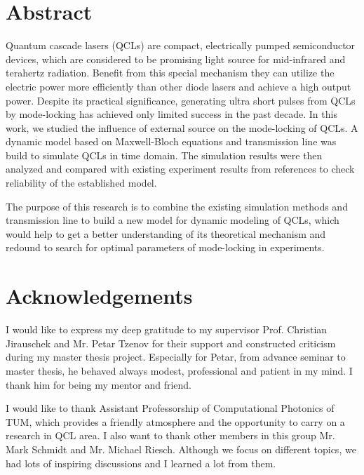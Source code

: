 \documentclass[11pt,final]{scrbook}
\begin{document}







\chapter*{Abstract}
Quantum cascade lasers (QCLs) are compact, electrically pumped semiconductor devices, which are considered to be promising light source for mid-infrared and terahertz radiation. Benefit from this special mechanism they can utilize the electric power more efficiently than other diode lasers and achieve a high output power. Despite its practical significance, generating ultra short pulses from QCLs by mode-locking has achieved only limited success in the past decade. In this work, we studied the influence of external source on the mode-locking of QCLs. A dynamic model based on Maxwell-Bloch equations and transmission line was build to simulate QCLs in time domain. The simulation results were then analyzed and compared with existing experiment results from references to check reliability of the established model.

The purpose of this research is to combine the existing simulation methods and transmission line to build a new model for dynamic modeling of QCLs, which would help to get a better understanding of its theoretical mechanism and redound to search for optimal parameters of mode-locking in experiments. 

\chapter*{Acknowledgements} 
I would like to express my deep gratitude to my supervisor Prof. Christian Jirauschek and Mr. Petar Tzenov for their support and constructed criticism during my master thesis project. Especially for Petar, from advance seminar to master thesis, he behaved always modest, professional and patient in my mind. I thank him for being my mentor and friend.

I would like to thank Assistant Professorship of Computational Photonics of TUM, which provides a friendly atmosphere and the opportunity to carry on a research in QCL area. I also want to thank other members in this group Mr. Mark Schmidt and Mr. Michael Riesch. Although we focus on different topics, we had lots of inspiring discussions and I learned a lot from them.
\end{document}
